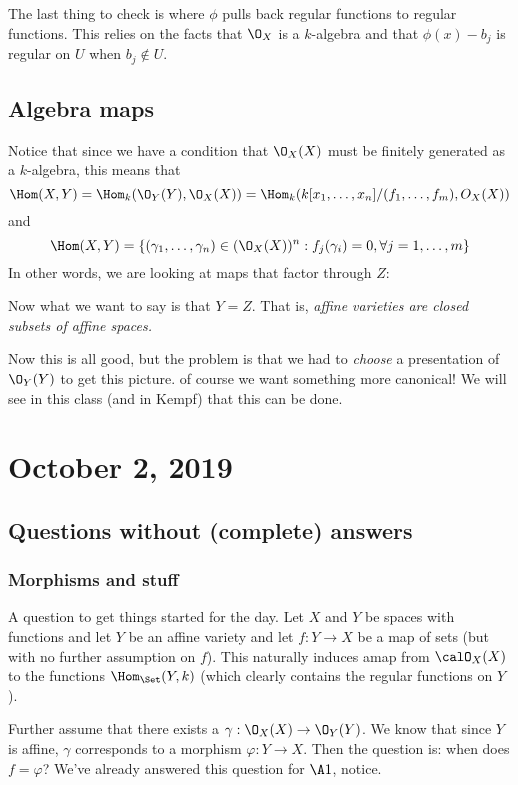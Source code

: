 \documentclass[12pt]{article}
\begin{document}
The last thing to check is where $\phi$ pulls back regular functions to regular functions. This relies on the facts that $\O_X$ is a $k$-algebra and that 
$\phi(x)-b_j$ is regular on $U$ when $b_j\notin U$.

\subsection{Algebra maps}
Notice that since we have a condition that $\O_X(X)$ must be finitely generated as a $k$-algebra, this means that 
\[\Hom(X,Y)=\Hom_k(\O_Y(Y),\O_X(X))=\Hom_k(k[x_1,\dots,x_n]/(f_1,\dots,f_m),O_X(X))\]
and
\[\Hom(X,Y)=\{(\gamma_1,\dots,\gamma_n)\in(\O_X(X))^n:f_j(\gamma_i)=0,\forall j=1,\dots,m\}\]
In other words, we are looking at maps that factor through $Z$:
\begin{center}
\end{center}
Now what we want to say is that $Y=Z$. That is, \textit{affine varieties are closed subsets of affine spaces.}

Now this is all good, but the problem is that we had to \textit{choose} a presentation of $\O_Y(Y)$ to get this picture.
of course we want something more canonical! We will see in this class (and in Kempf) that this can be done.

\section{October 2, 2019}
\subsection{Questions without (complete) answers}
\subsubsection{Morphisms and stuff}
A question to get things started for the day. Let $X$ and $Y$ be spaces with functions and let $Y$ be an affine variety and let $f:Y\to X$ be a map of sets 
(but with no further assumption on $f$). This naturally induces amap from $\calO_X(X)$ to the functions $\Hom_{\Set}(Y,k)$ (which 
clearly contains the regular functions on $Y$).

Further assume that there exists a $\gamma:\O_X(X)\to\O_Y(Y)$. We know that since $Y$ is affine, $\gamma$ corresponds to a morphism $\varphi:Y\to X$.
Then the question is: when does $f=\varphi$? We've already answered this question for $\A1$, notice.
\end{document}
